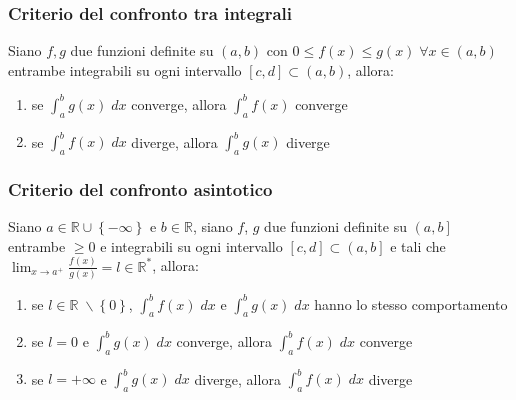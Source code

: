 \documentclass[a4paper]{article}
\begin{document}
\subsubsection*{Criterio del confronto tra integrali}
Siano \(f, g\) due funzioni definite su \(\left(a, b\right)\) con \(0 \leq f(x) \leq g(x) \; \forall x \in \left(a, b\right)\) entrambe integrabili su ogni intervallo
\(\left[c, d\right] \subset \left(a, b\right)\), allora:
\begin{enumerate}
	\item se \(\displaystyle \int_{a}^{b} g(x) \; dx\) converge, allora \(\displaystyle \int_{a}^{b} f(x)\) converge
	\item se \(\displaystyle \int_{a}^{b} f(x) \; dx\) diverge, allora \(\displaystyle \int_{a}^{b} g(x)\) diverge
\end{enumerate}

\subsubsection*{Criterio del confronto asintotico}
Siano \(a \in \mathbb{R} \cup \left\{- \infty\right\}\) e \(b \in \mathbb{R}\), siano \(f\), \(g\) due funzioni definite su \(\left(a, b\right]\) entrambe \(\geq 0\) e integrabili
su ogni intervallo \(\left[c, d\right] \subset \left(a, b\right]\) e tali che \(\displaystyle \lim_{x \to a^+} \frac{f(x)}{g(x)} = l \in \mathbb{R}^*\), allora:
\begin{enumerate}
	\item se \(l \in \mathbb{R} \; \backslash \left\{0\right\}\), \(\displaystyle \int_{a}^{b} f(x) \; dx\) e \(\displaystyle \int_{a}^{b} g(x) \; dx\) hanno lo stesso comportamento
	\item se \(l = 0\) e \(\displaystyle \int_{a}^{b} g(x) \; dx\) converge, allora \(\displaystyle \int_{a}^{b} f(x) \; dx\) converge
	\item se \(l = +\infty\) e \(\displaystyle \int_{a}^{b} g(x) \; dx\) diverge, allora \(\displaystyle \int_{a}^{b} f(x) \; dx\) diverge
\end{enumerate}
\end{document}
